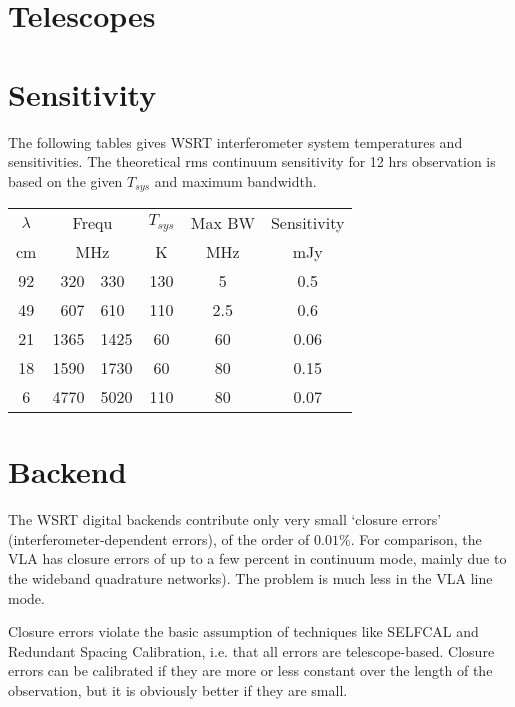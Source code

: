 \section{Telescopes} 


\section{Sensitivity} 
\label{.sensitivity} 

The following tables gives WSRT interferometer system temperatures and
sensitivities. The theoretical rms continuum sensitivity for 12 hrs observation
is based on the given $T_{sys}$ and maximum bandwidth. 

\begin{center} 
\begin{tabular}{|c|r@{--}l|c|c|c|} 
\hline 
\multicolumn{1}{|c|}{$\lambda$} & 
\multicolumn{2}{|c|}{Frequ} & 
\multicolumn{1}{|c|}{$T_{sys}$} & 
\multicolumn{1}{|c|}{Max BW} & 
\multicolumn{1}{|c|}{Sensitivity} \\    %
\multicolumn{1}{|c|}{cm}  & 
\multicolumn{2}{|c|}{MHz} & 
\multicolumn{1}{|c|}{K}  & 
\multicolumn{1}{|c|}{MHz} & 
\multicolumn{1}{|c|}{mJy} \\            %
\hline 92 &  320 & 330  & 130 &  5   & 0.5 \\ 49 &  607 & 610  & 110 &  2.5 &
0.6 \\ 21 & 1365 & 1425 &  60 & 60   & 0.06 \\ 18 & 1590 & 1730 &  60 & 80   &
0.15 \\ 
 6 & 4770 & 5020 & 110 & 80 & 0.07 \\ \hline 
\end{tabular} 
\end{center} 




\section{Backend} 

	The WSRT digital backends contribute only very small `closure 
errors' (interferometer-dependent errors), of the order of $0.01\%$.
For comparison, the VLA has closure errors of up to a few percent in continuum
mode, mainly due to the wideband quadrature networks).  The problem is much
less in the VLA line mode. 

	Closure errors violate the basic assumption of techniques like SELFCAL
and Redundant Spacing Calibration, i.e.  that all errors are telescope-based.
Closure errors can be calibrated if they are more or less constant over the
length of the observation, but it is obviously better if they are small. 

